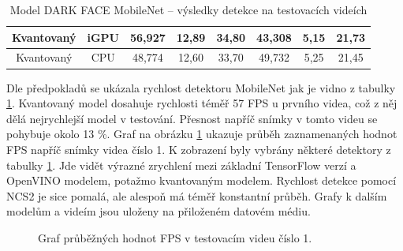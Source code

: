 \begin{table}[H]
\begin{tabular}{cc|ccc|ccc|}
  \multicolumn{1}{|c|}{\cellcolor[HTML]{E0DBDB}Kvantovaný}     & \cellcolor[HTML]{E0DBDB}iGPU & \multicolumn{1}{c|}{56,927}                                 & \multicolumn{1}{c|}{12,89}                                  & 34,80          & \multicolumn{1}{c|}{43,308}                                 & \multicolumn{1}{c|}{5,15}                                   & 21,73          \\ \hline
  \multicolumn{1}{|c|}{\cellcolor[HTML]{E0DBDB}Kvantovaný}     & \cellcolor[HTML]{E0DBDB}CPU  & \multicolumn{1}{c|}{48,774}                                 & \multicolumn{1}{c|}{12,60}                                  & 33,70          & \multicolumn{1}{c|}{49,732}                                 & \multicolumn{1}{c|}{5,25}                                   & 21,45          \\ \hline
  \end{tabular}
  \label{tabulka:dfmvidea}
  \caption{Model DARK FACE MobileNet -- výsledky detekce na testovacích videích}
\end{table}

Dle předpokladů se ukázala rychlost detektoru MobileNet jak je vidno z tabulky \ref{tabulka:dfmvidea}. Kvantovaný model dosahuje rychlosti téměř 57 FPS u prvního videa, což z něj dělá nejrychlejší model v testování. Přesnost napříč snímky v tomto videu se pohybuje okolo 13 \%. Graf na obrázku \ref{obrazek:dfm_video1_graf} ukazuje průběh zaznamenaných hodnot FPS napříč snímky videa číslo 1. K zobrazení byly vybrány některé detektory z tabulky \ref{tabulka:dfmvidea}. Jde vidět výrazné zrychlení mezi základní TensorFlow verzí a OpenVINO modelem, potažmo kvantovaným modelem. Rychlost detekce pomocí NCS2 je sice pomalá, ale alespoň má téměř konstantní průběh.
Grafy k dalším modelům a videím jsou uloženy na přiloženém datovém médiu.

\begin{figure}[H] 
  \begin{center}
  \label{obrazek:dfm_video1_graf}
  \caption{Graf průběžných hodnot FPS v testovacím videu číslo 1.}
  \end{center}
\end{figure}

